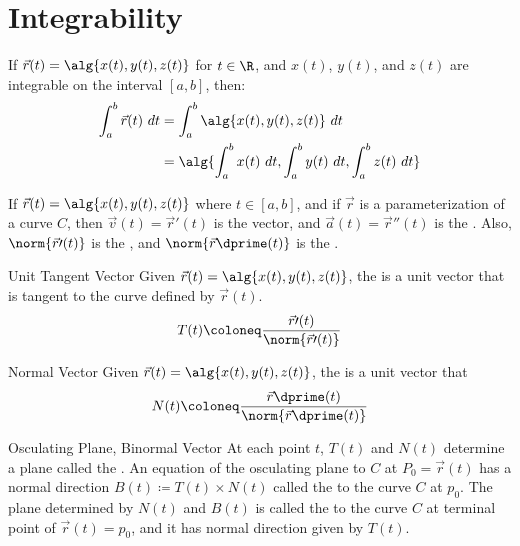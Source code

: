 \section{Integrability}

If $\vec{r}(t) = \alg{x(t), y(t), z(t)}$ for $t \in \R$, and $x(t)$, $y(t)$, and $z(t)$ are integrable on the interval $[a,b]$, then:
\begin{align*}
     \int_a^b \vec{r}(t)\ dt
     &= \int_a^b \alg{x(t), y(t), z(t)}\ dt \\
     &= \alg{ \int_a^b x(t)\ dt, \int_a^b y(t)\ dt, \int_a^b z(t)\ dt}
\end{align*}

If $\vec{r}(t) = \alg{x(t), y(t), z(t)}$ where $t \in [a,b]$, and if $\vec{r}$ is a parameterization of a curve $C$, then $\vec{v}(t) = \vec{r}\prime(t)$ is the  vector, and $\vec{a}(t) = \vec{r}\dprime (t)$ is the . Also, $\norm{ \vec{r}\prime(t) }$ is the , and $\norm{ \vec{r}\dprime(t) }$ is the .

\begin{dfnbox}{Unit Tangent Vector}{}
    Given $\vec{r}(t) = \alg{x(t), y(t), z(t)}$, the  is a unit vector that is tangent to the curve defined by $\vec{r}(t)$.
    \tcblower
    \[ T(t) \coloneq \frac{\vec{r}\prime(t)}{\norm{ \vec{r}\prime(t) }} \]
\end{dfnbox}

\begin{dfnbox}{Normal Vector}{}
    Given $\vec{r}(t) = \alg{x(t), y(t), z(t)}$, the  is a unit vector that
    \tcblower
    \[ N(t) \coloneq  \frac{\vec{r}\dprime(t)}{\norm{ \vec{r}\dprime(t)} } \]
\end{dfnbox}

\begin{dfnbox}{Osculating Plane, Binormal Vector}{}
    At each point $t$, $T(t)$ and $N(t)$ determine a plane called the . An equation of the osculating plane to $C$ at $P_0 = \vec{r}(t)$ has a normal direction $B(t) \coloneq T(t) \times N(t)$ called the  to the curve $C$ at $p_0$. The plane determined by $N(t)$ and $B(t)$ is called the  to the curve $C$ at terminal point of $\vec{r}(t) = p_0$, and it has normal direction given by $T(t)$.
\end{dfnbox}

